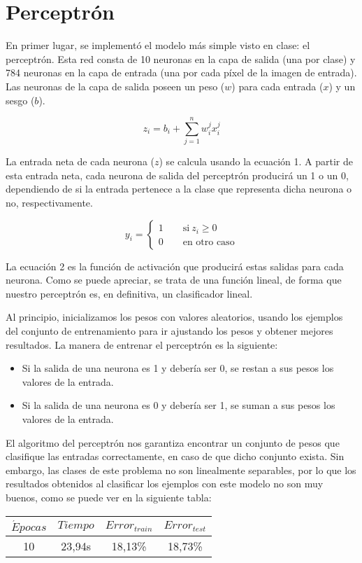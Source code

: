 \section{Perceptrón}
En primer lugar, se implementó el modelo más simple visto en clase: el perceptrón. Esta red consta de 10 neuronas en la capa de salida (una por clase) y 784 neuronas en la capa de entrada (una por cada píxel de la imagen de entrada). Las neuronas de la capa de salida poseen un peso ($w$) para cada entrada ($x$) y un sesgo ($b$).

\begin{equation}
    z_i = b_i + \sum_{j=1}^n w_i^j x_i^j
\end{equation}

La entrada neta de cada neurona ($z$) se calcula usando la ecuación 1. A partir de esta entrada neta, cada neurona de salida del perceptrón producirá un 1 o un 0, dependiendo de si la entrada pertenece a la clase que representa dicha neurona o no, respectivamente.

\begin{equation}
    y_i =
    \begin{cases}
        1 \qquad \text{si}\ z_i \geq 0\\
        0 \qquad \text{en otro caso}
    \end{cases}
\end{equation}

La ecuación 2 es la función de activación que producirá estas salidas para cada neurona. Como se puede apreciar, se trata de una función lineal, de forma que nuestro perceptrón es, en definitiva, un clasificador lineal.

Al principio, inicializamos los pesos con valores aleatorios, usando los ejemplos del conjunto de entrenamiento para ir ajustando los pesos y obtener mejores resultados. La manera de entrenar el perceptrón es la siguiente:
\begin{itemize}
    \item Si la salida de una neurona es 1 y debería ser 0, se restan a sus pesos los valores de la entrada.
    \item Si la salida de una neurona es 0 y debería ser 1, se suman a sus pesos los valores de la entrada.
\end{itemize}

El algoritmo del perceptrón nos garantiza encontrar un conjunto de pesos que clasifique las entradas correctamente, en caso de que dicho conjunto exista. Sin embargo, las clases de este problema no son linealmente separables, por lo que los resultados obtenidos al clasificar los ejemplos con este modelo no son muy buenos, como se puede ver en la siguiente tabla:

\begin{center}
    \begin{tabular}{ |c|c|c|c| } 
        \hline
        $\acute Epocas$ & $Tiempo$ & $Error_{train}$ & $Error_{test}$ \\
        \hline
        10       & 23,94s   &  18,13\%        & 18,73\%        \\
        \hline
    \end{tabular}
\end{center}
